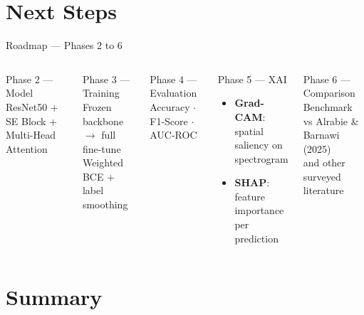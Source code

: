 \documentclass[aspectratio=169, 10pt]{beamer}
\newcommand{\hl}[1]{\textbf{\color{accent}#1}}
\begin{document}
\section{Next Steps}

\begin{frame}{Roadmap --- Phases 2 to 6}
  \begin{columns}[T]
      \begin{block}{Phase 2 --- Model}
        ResNet50 + SE Block + Multi-Head Attention
      \end{block}
      \vspace{4pt}
      \begin{block}{Phase 3 --- Training}
        Frozen backbone $\to$ full fine-tune\\
        \small Weighted BCE + label smoothing
      \end{block}
      \vspace{4pt}
      \begin{block}{Phase 4 --- Evaluation}
        Accuracy $\cdot$ F1-Score $\cdot$ AUC-ROC
      \end{block}

      \begin{block}{Phase 5 --- XAI}
        \begin{itemize}
          \item \hl{Grad-CAM}: spatial saliency on spectrogram
          \item \hl{SHAP}: feature importance per prediction
        \end{itemize}
      \end{block}
      \vspace{4pt}
      \begin{block}{Phase 6 --- Comparison}
        Benchmark vs Alrabie \& Barnawi (2025)\\
        and other surveyed literature
      \end{block}
    \end{columns}
\end{frame}

\section*{Summary}
\end{document}
